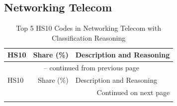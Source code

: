 \clearpage

\subsection{Networking Telecom}

\begin{longtable}{lrp{12cm}}
\caption{Top 5 HS10 Codes in Networking Telecom with Classification Reasoning}\\
\toprule
HS10 & Share (\%) & Description and Reasoning \\
\midrule
\endfirsthead

\multicolumn{3}{c}{{\tablename\ \thetable{} -- continued from previous page}} \\
\toprule
HS10 & Share (\%) & Description and Reasoning \\
\midrule
\endhead

\midrule
\multicolumn{3}{r}{{Continued on next page}} \\
\endfoot

\bottomrule
\endlastfoot


\end{longtable}
